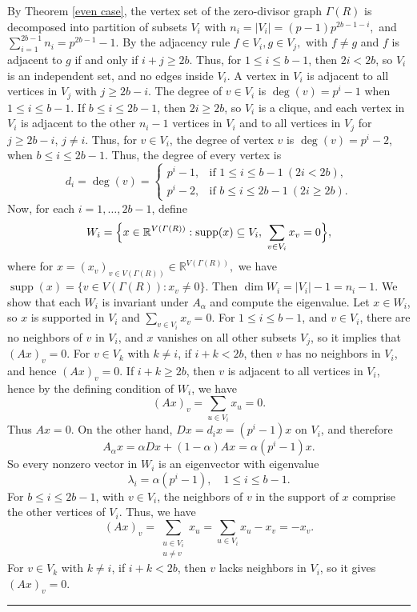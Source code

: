 \documentclass[12pt,twoside]{article}
\renewenvironment{proof}{{\noindent\bfseries Proof.}}{\qed}
\def\qed{\nolinebreak\hfill\rule{.2cm}{.2cm}\par\addvspace{.5cm}}
\begin{document}
\begin{proof}
By Theorem \ref{even case}, the vertex set of the zero-divisor graph $ \varGamma(R)$ is decomposed into partition of subsets $V_i$ with $n_i = |V_i| = (p-1)p^{ 2b-1-i}, $ and $\sum_{i=1}^{2b-1}n_i = p^{ 2b-1}-1.$	By the adjacency rule $	f\in V_i, g\in V_j, $ with $f\ne g  $ and $f $ is adjacent to $ g  $ if and only if $ i+j\ge 2b.$ Thus,  for $1\le i\le b-1$, then $2i<2b$, so $V_i$ is an independent set, and 		no edges inside $V_i$. A vertex in $V_i$ is adjacent to all vertices in $V_j$ with $j\ge 2b-i$. The degree of $ v\in V_{i}$ is $\deg(v)=p^{ i}-1$ when $1\le i\le b-1$. 	If $b\le i\le 2b-1$, then $2i\ge 2b$, so $V_i$ is a clique, and 
		each vertex in $V_i$ is adjacent to the other $n_i-1$ vertices in $V_i$
		and to all vertices in $V_j$ for $j\ge 2b-i$, $j\ne i$. Thus, for $v\in V_{i}$, the degree of vertex $v$ is		$\deg(v) = p^{ i}-2$, when $b\le i\le 2b-1$. Thus, the degree of every vertex is
		\[
		d_i = \deg(v) =
		\begin{cases}
			p^{ i} - 1, & \text{if } 1\le i \le b-1 \ (2i<2b),\\[3pt]
			p^{ i} - 2, & \text{if } b\le i \le 2b-1 \ (2i\ge 2b).
		\end{cases}
		\]
	Now, for each $i=1,\dots,2b-1$, define
	\[
	W_i = \Bigl\{x\in\mathbb{R}^{V( \varGamma(R))} :
	\mathrm{supp}(x)\subseteq V_i,\ \sum_{v\in V_i} x_v = 0\Bigr\},
	\]
	where  for $x = (x_v)_{v \in V( \varGamma(R))} \in \mathbb{R}^{V( \varGamma(R))},$ we have $\operatorname{supp}(x)= \{  v \in V( \varGamma(R)) : x_v \neq 0  \}.$ 	Then $\dim W_i = |V_i|-1 = n_i -1$. We show that each $W_i$ is invariant under $A_\alpha$ and compute the eigenvalue. Let $x\in W_i$, so $x$ is supported in $V_i$ and $\sum_{v\in V_i}x_v=0$. For $1\le i\le b-1$, and  $v\in V_i$, there are no neighbors of $v$ in $V_i$, and $x$ vanishes on all
	other subsets $V_{j}$, so it implies that $(Ax)_v=0$. For $v\in V_k$ with $k\ne i$, if $i+k<2b$, then $v$ has no neighbors in $V_i$, and hence $(Ax)_v=0$.   If $i+k\ge 2b$, then $v$ is adjacent to all vertices in $V_i$, hence by the defining condition of $W_i$, we have
	\[
	(Ax)_v = \sum_{u\in V_i} x_u = 0.
	\]
	Thus $Ax=0$. On the other hand, $Dx=d_i x=(p^{ i}-1)x$ on $V_i$, and therefore
	\[
	A_\alpha x = \alpha Dx + (1-\alpha)Ax
	= \alpha(p^{ i}-1)x.
	\]
	So every nonzero vector in $W_i$ is an eigenvector with eigenvalue
	\[
	\lambda_i = \alpha(p^{ i}-1),\quad 1\le i\le b-1.
	\]
	For \( b \leq i \leq 2b-1 \), with \( v \in V_i \), the neighbors of \( v \) in the support of \( x \) comprise the other vertices of \( V_i \). Thus, we have \[ (Ax)_v = \sum_{\substack{u \in V_i \\ u \neq v}} x_u = \sum_{u \in V_i} x_u - x_v = -x_v. \] For $v\in V_k$ with $k\ne i$, if $i+k<2b$, then $v$ lacks neighbors in $V_i$, so it gives $(Ax)_v=0$.

\end{proof}
\end{document}

